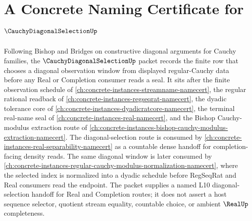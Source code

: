 \chapter{A Concrete Naming Certificate for $\CauchyDiagonalSelectionUp$}
\label{ch:concrete-instances-cauchy-diagonal-selection-namecert}

Following Bishop and Bridges on constructive diagonal arguments for Cauchy families, the $\CauchyDiagonalSelectionUp$ packet records the finite row that chooses a diagonal observation window from displayed regular-Cauchy data before any Real or Completion consumer reads a seal. It sits after the finite observation schedule of \autoref{ch:concrete-instances-streamname-namecert}, the regular rational readback of \autoref{ch:concrete-instances-regseqrat-namecert}, the dyadic tolerance core of \autoref{ch:concrete-instances-dyadicratcore-namecert}, the terminal real-name seal of \autoref{ch:concrete-instances-real-namecert}, and the Bishop Cauchy-modulus extraction route of \autoref{ch:concrete-instances-bishop-cauchy-modulus-extraction-namecert}. The diagonal-selection route is consumed by \autoref{ch:concrete-instances-real-separability-namecert} as a countable dense handoff for completion-facing density reads. The same diagonal window is later consumed by \autoref{ch:concrete-instances-regular-cauchy-modulus-normalization-namecert}, where the selected index is normalized into a dyadic schedule before RegSeqRat and Real consumers read the endpoint. The packet supplies a named L10 diagonal-selection handoff for Real and Completion routes; it does not assert a host sequence selector, quotient stream equality, countable choice, or ambient $\RealUp$ completeness.

